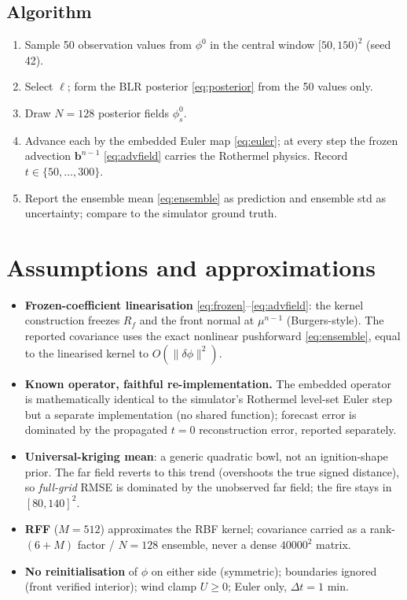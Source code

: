 \documentclass[11pt]{article}
\newcommand{\bb}{\mathbf{b}}
\begin{document}
\subsection{Algorithm}

\begin{enumerate}\itemsep0pt
  \item Sample 50 observation values from $\phi^{0}$ in the central window
        $[50,150)^2$ (seed 42).
  \item Select $\ell$; form the BLR posterior \eqref{eq:posterior} from the 50
        values only.
  \item Draw $N=128$ posterior fields $\phi^{0}_s$.
  \item Advance each by the embedded Euler map \eqref{eq:euler}; at every step the
        frozen advection $\bb^{n-1}$ \eqref{eq:advfield} carries the Rothermel
        physics. Record $t\in\{50,\dots,300\}$.
  \item Report the ensemble mean \eqref{eq:ensemble} as prediction and ensemble std
        as uncertainty; compare to the simulator ground truth.
\end{enumerate}

\section{Assumptions and approximations}

\begin{itemize}\itemsep1pt
  \item \textbf{Frozen-coefficient linearisation} \eqref{eq:frozen}--\eqref{eq:advfield}:
        the kernel construction freezes $R_f$ and the front normal at $\mu^{n-1}$
        (Burgers-style). The reported covariance uses the exact nonlinear
        pushforward \eqref{eq:ensemble}, equal to the linearised kernel to
        $O(\lVert\delta\phi\rVert^2)$.
  \item \textbf{Known operator, faithful re-implementation.} The embedded operator
        is mathematically identical to the simulator's Rothermel level-set Euler
        step but a separate implementation (no shared function); forecast error is
        dominated by the propagated $t=0$ reconstruction error, reported
        separately.
  \item \textbf{Universal-kriging mean}: a generic quadratic bowl, not an
        ignition-shape prior. The far field reverts to this trend (overshoots the
        true signed distance), so \emph{full-grid} RMSE is dominated by the
        unobserved far field; the fire stays in $[80,140]^2$.
  \item \textbf{RFF} ($M=512$) approximates the RBF kernel; covariance carried as a
        rank-$(6{+}M)$ factor / $N=128$ ensemble, never a dense $40000^2$ matrix.
  \item \textbf{No reinitialisation} of $\phi$ on either side (symmetric);
        boundaries ignored (front verified interior); wind clamp $U\ge0$; Euler
        only, $\Delta t=1$ min.
\end{itemize}
\end{document}
